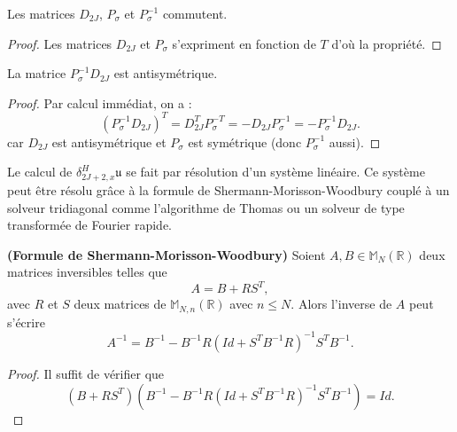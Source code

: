 \begin{proposition}
Les matrices $D_{2J}$, $P_{\sigma}$ et $P^{-1}_{\sigma}$ commutent.
\end{proposition}

\begin{proof}
Les matrices $D_{2J}$ et $P_{\sigma}$ s'expriment en fonction de $T$ d'où la propriété.
\end{proof}

\begin{proposition}
La matrice $P^{-1}_{\sigma}D_{2J}$ est antisymétrique.
\label{prop:derhermi_antisym}
\end{proposition}

\begin{proof}
Par calcul immédiat, on a :
\begin{equation}
(P^{-1}_{\sigma}D_{2J})^T = D_{2J}^T P_{\sigma}^{-T} = - D_{2J} P_{\sigma}^{-1} = - P_{\sigma}^{-1} D_{2J}.
\end{equation}
car $D_{2J}$ est antisymétrique et $P_{\sigma}$ est symétrique (donc $P^{-1}_{\sigma}$ aussi). 
\end{proof}

Le calcul de $\delta_{2J+2,x}^H \mathfrak{u}$ se fait par résolution d'un système linéaire. Ce système peut être résolu grâce à la formule de Shermann-Morisson-Woodbury couplé à un solveur tridiagonal comme l'algorithme de Thomas ou un solveur de type transformée de Fourier rapide.

\begin{proposition}
\textbf{(Formule de Shermann-Morisson-Woodbury)} Soient $A, B \in \mathbb{M}_N \left(\mathbb{R} \right)$ deux matrices inversibles telles que 
\begin{equation}
A = B + R S^T,
\end{equation}
avec $R$ et $S$ deux matrices de $\mathbb{M}_{N,n} \left(\mathbb{R} \right)$ avec $n \leq N$.
Alors l'inverse de $A$ peut s'écrire
\begin{equation}
A^{-1} = B^{-1} - B^{-1} R \left( Id + S^T B^{-1} R  \right)^{-1} S^T B^{-1}.
\label{eq:SMW}
\end{equation}
\end{proposition}

\begin{proof}
Il suffit de vérifier que 
\begin{equation}
\left( B + R S^T \right) \left( B^{-1} - B^{-1} R \left( Id + S^T B^{-1} R  \right)^{-1} S^T B^{-1} \right) = Id.
\end{equation}
\end{proof}

